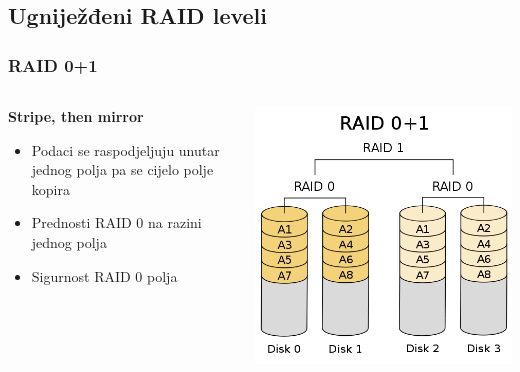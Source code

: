 \documentclass[t]{beamer}
\begin{document}
\subsection{Ugniježđeni RAID leveli}
        \begin{frame}
	\frametitle{RAID 0+1}
	
	\begin{columns}[T]
	\begin{column}{0.55\textwidth}
		\textbf{Stripe, then mirror}
		\begin{itemize}
			\item Podaci se raspodjeljuju unutar jednog polja pa se cijelo polje kopira
		\end{itemize}
		\begin{itemize}
			\item Prednosti RAID 0 na razini jednog polja
			\item Sigurnost RAID 0 polja
		\end{itemize}
	\end{column}
	\begin{column}{0.45\textwidth}
		\includegraphics[width=\textwidth]{500px-RAID_01.png}
	\end{column}
	\end{columns}
\end{frame}
\end{document}
